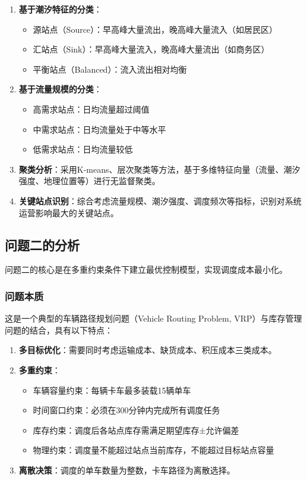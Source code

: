 \documentclass[12pt,a4paper]{ctexart}
\begin{document}
\begin{enumerate}
    \item \textbf{基于潮汐特征的分类}：
    \begin{itemize}
        \item 源站点（Source）：早高峰大量流出，晚高峰大量流入（如居民区）
        \item 汇站点（Sink）：早高峰大量流入，晚高峰大量流出（如商务区）
        \item 平衡站点（Balanced）：流入流出相对均衡
    \end{itemize}

    \item \textbf{基于流量规模的分类}：
    \begin{itemize}
        \item 高需求站点：日均流量超过阈值
        \item 中需求站点：日均流量处于中等水平
        \item 低需求站点：日均流量较低
    \end{itemize}

    \item \textbf{聚类分析}：采用K-means、层次聚类等方法，基于多维特征向量（流量、潮汐强度、地理位置等）进行无监督聚类。

    \item \textbf{关键站点识别}：综合考虑流量规模、潮汐强度、调度频次等指标，识别对系统运营影响最大的关键站点。
\end{enumerate}

\subsection{问题二的分析}

问题二的核心是在多重约束条件下建立最优控制模型，实现调度成本最小化。

\subsubsection{问题本质}

这是一个典型的车辆路径规划问题（Vehicle Routing Problem, VRP）与库存管理问题的结合，具有以下特点：

\begin{enumerate}
    \item \textbf{多目标优化}：需要同时考虑运输成本、缺货成本、积压成本三类成本。

    \item \textbf{多重约束}：
    \begin{itemize}
        \item 车辆容量约束：每辆卡车最多装载15辆单车
        \item 时间窗口约束：必须在300分钟内完成所有调度任务
        \item 库存约束：调度后各站点库存需满足期望库存±允许偏差
        \item 物理约束：调度量不能超过站点当前库存，不能超过目标站点容量
    \end{itemize}

    \item \textbf{离散决策}：调度的单车数量为整数，卡车路径为离散选择。
\end{enumerate}
\end{document}

